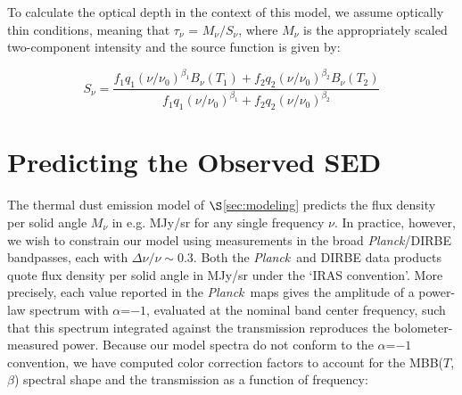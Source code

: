 \documentclass{emulateapj}
\newcommand{\PLANCK}{{\it Planck}}
\begin{document}

To calculate the optical depth in the context of this model, we assume
optically thin conditions, meaning that $\tau_{\nu}$ = $M_{\nu}/S_{\nu}$, where
$M_{\nu}$ is the appropriately scaled two-component intensity and the source
function is given by:

\begin{equation}
\label{eqn:source}
S_{\nu} = \frac{f_1q_1(\nu/\nu_0)^{\beta_1}B_{\nu}(T_1) + f_2q_2(\nu/\nu_0)^{\beta_2}B_{\nu}(T_2)}{f_1q_1(\nu/\nu_0)^{\beta_1}+f_2q_2(\nu/\nu_0)^{\beta_2}}
\end{equation}

\section{Predicting the Observed SED}
\label{sec:bpcorr}

The thermal dust emission model of $\S$\ref{sec:modeling} predicts the 
flux density per solid angle $M_{\nu}$ in e.g. MJy/sr for any single frequency 
$\nu$. In practice, however, we wish to constrain our model using measurements 
in the broad \PLANCK/DIRBE bandpasses, each with $\Delta\nu/\nu\sim0.3$. 
Both the \PLANCK~and DIRBE data products quote flux density per solid 
angle in MJy/sr under the `IRAS convention'. More precisely, each value 
reported in the \PLANCK~maps gives the amplitude of a power-law spectrum 
with $\alpha$=$-1$, evaluated at the nominal band center frequency, such that 
this spectrum integrated against the transmission reproduces the 
bolometer-measured power. Because our model spectra do not conform to the 
$\alpha$=$-1$ convention, we have computed color correction factors to account 
for the MBB($T$, $\beta$) spectral shape and the transmission as a function of 
frequency:

\end{document}
